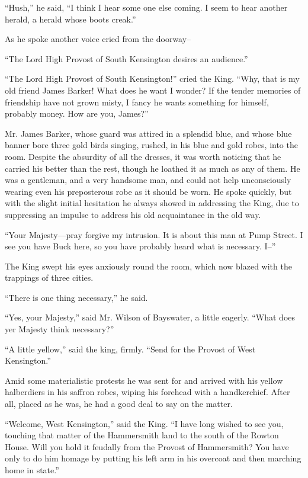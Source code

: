 \documentclass{book}
\begin{document}
“Hush,” he said, “I think I hear some one else coming. I seem to hear another herald, a herald whose boots creak.”

As he spoke another voice cried from the doorway–

“The Lord High Provost of South Kensington desires an audience.”

“The Lord High Provost of South Kensington!” cried the King. “Why, that is my old friend James Barker! What does he want I wonder? If the tender memories of friendship have not grown misty, I fancy he wants something for himself, probably money. How are you, James?”

Mr. James Barker, whose guard was attired in a splendid blue, and whose blue banner bore three gold birds singing, rushed, in his blue and gold robes, into the room. Despite the absurdity of all the dresses, it was worth noticing that he carried his better than the rest, though he loathed it as much as any of them. He was a gentleman, and a very handsome man, and could not help unconsciously wearing even his preposterous robe as it should be worn. He spoke quickly, but with the slight initial hesitation he always showed in addressing the King, due to suppressing an impulse to address his old acquaintance in the old way.

“Your Majesty—pray forgive my intrusion. It is about this man at Pump Street. I see you have Buck here, so you have probably heard what is necessary. I–”

The King swept his eyes anxiously round the room, which now blazed with the trappings of three cities.

“There is one thing necessary,” he said.

“Yes, your Majesty,” said Mr. Wilson of Bayswater, a little eagerly. “What does yer Majesty think necessary?”

“A little yellow,” said the king, firmly. “Send for the Provost of West Kensington.”

Amid some materialistic protests he was sent for and arrived with his yellow halberdiers in his saffron robes, wiping his forehead with a handkerchief. After all, placed as he was, he had a good deal to say on the matter.

“Welcome, West Kensington,” said the King. “I have long wished to see you, touching that matter of the Hammersmith land to the south of the Rowton House. Will you hold it feudally from the Provost of Hammersmith? You have only to do him homage by putting his left arm in his overcoat and then marching home in state.”
\end{document}
